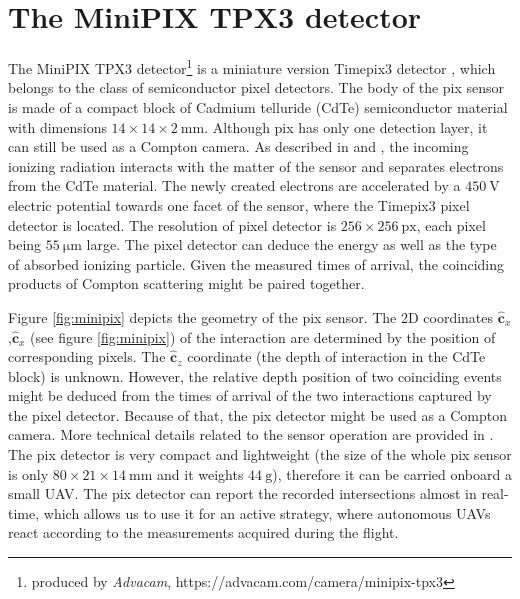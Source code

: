 \section{The MiniPIX TPX3 detector} %
The MiniPIX TPX3 detector\footnote{produced by \textit{Advacam}, https://advacam.com/camera/minipix-tpx3} is a miniature version Timepix3 detector \cite{timepix3}, which belongs to the class of semiconductor pixel detectors.
The body of the \ac{pix} sensor is made of a compact block of Cadmium telluride (CdTe) semiconductor material with dimensions $14 \times 14 \times 2 \ \si{\milli\meter}$.
Although \ac{pix} has only one detection layer, it can still be used as a Compton camera.
As described in \cite{baca2021gamma} and \cite{baca2019timepix}, the incoming ionizing radiation interacts with the matter of the sensor and separates electrons from the CdTe material.
The newly created electrons are accelerated by a $\SI{450}{\volt}$ electric potential towards one facet of the sensor, where the Timepix3 pixel detector is located.
The resolution of pixel detector is $256 \times 256\ \mathrm{px}$, each pixel being $55\ \si{\micro\meter}$ large.
The pixel detector can deduce the energy as well as the type of absorbed ionizing particle.
Given the measured times of arrival, the coinciding products of Compton scattering might be paired together.

Figure \ref{fig:minipix} depicts the geometry of the \ac{pix} sensor.
The 2D coordinates $\mathbf{\hat{c}}_{x}$,$\mathbf{\hat{c}}_{x}$ (see figure \ref{fig:minipix}) of the interaction are determined by the position of corresponding pixels.
The $\mathbf{\hat{c}}_{z}$ coordinate (the depth of interaction in the CdTe block) is unknown.
However, the relative depth position of two coinciding events might be deduced from the times of arrival of the two interactions captured by the pixel detector.
Because of that, the \ac{pix} detector might be used as a Compton camera.
More technical details related to the sensor operation are provided in \cite{baca2019timepix}.
The \ac{pix} detector is very compact and lightweight (the size of the whole \ac{pix} sensor is only $80 \times 21 \times 14 \ \si{\milli\meter}$ and it weights $\SI{44}{\gram}$), therefore it can be carried onboard a small \ac{UAV}.
The \ac{pix} detector can report the recorded intersections almost in real-time, which allows us to use it for an active strategy, where autonomous \ac{UAV}s react according to the measurements acquired during the flight.

